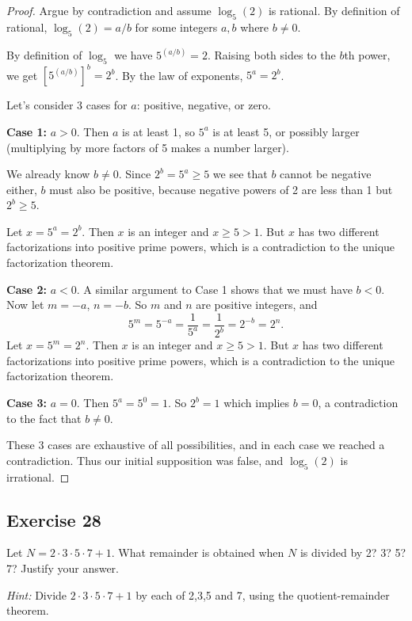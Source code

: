 \documentclass[14pt]{extarticle}
\begin{document}
\begin{proof}
Argue by contradiction and assume $\log_5(2)$ is rational. By definition of rational, $\log_5(2) = a/b$ for some integers $a, b$ where $b \neq 0$. 

By definition of $\log_5$ we have $5^(a/b) = 2$. Raising both sides to the $b$th power, we get $[5^(a/b)]^b = 2^b$. By the law of exponents, $5^a = 2^b$. 

Let's consider 3 cases for $a$: positive, negative, or zero.

{\bf Case 1:} $a > 0$. Then $a$ is at least 1, so $5^a$ is at least 5, or possibly larger (multiplying by more factors of 5 makes a number larger).

We already know $b \neq 0$. Since $2^b = 5^a \geq 5$ we see that $b$ cannot be negative either, $b$ must also be positive, because negative powers of 2 are less than 1 but $2^b \geq 5$.

Let $x = 5^a = 2^b$. Then $x$ is an integer and $x \geq 5 > 1$. But $x$ has two different factorizations into positive prime powers, which is a contradiction to the unique factorization theorem.

{\bf Case 2:} $a < 0$. A similar argument to Case 1 shows that we must have $b < 0$. Now let $m = -a$, $n = -b$. So $m$ and $n$ are positive integers, and 
\[
5^m = 5^{-a} = \frac{1}{5^a} = \frac{1}{2^b} = 2^{-b} = 2^n.
\]
Let $x = 5^m = 2^n$. Then $x$ is an integer and $x \geq 5 > 1$. But $x$ has two different factorizations into positive prime powers, which is a contradiction to the unique factorization theorem.

{\bf Case 3:} $a = 0$. Then $5^a = 5^0 = 1$. So $2^b = 1$ which implies $b = 0$, a contradiction to the fact that $b \neq 0$.

These 3 cases are exhaustive of all possibilities, and in each case we reached a contradiction. Thus our initial supposition was false, and $\log_5(2)$ is irrational.
\end{proof}

\subsection{Exercise 28}
Let $N = 2\cdot3\cdot5\cdot7 + 1$. What remainder is obtained when $N$ is divided by 2? 3? 5? 7? Justify your answer.

{\it Hint:} Divide $2\cdot3\cdot5\cdot7 + 1$ by each of 2,3,5 and 7, using the quotient-remainder theorem.
\end{document}
